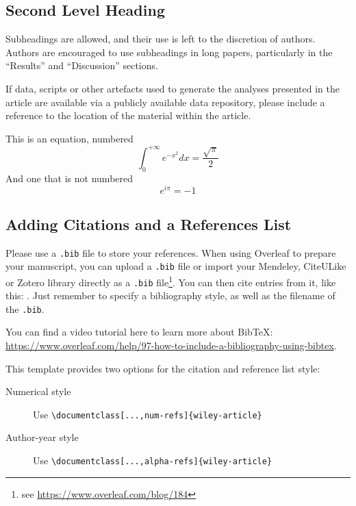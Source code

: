 \documentclass[num-refs]{wiley-article}
\begin{document}
\subsection{Second Level Heading}
Subheadings are allowed, and their use is left to the discretion of authors. 
Authors are encouraged to use subheadings in long papers, particularly in the “Results” and “Discussion” sections. 

If data, scripts or other artefacts used to generate the analyses presented in the article are available via a publicly available data repository, please include a reference to the location of the material within the article.

This is an equation, numbered
\begin{equation}
\int_0^{+\infty}e^{-x^2}dx=\frac{\sqrt{\pi}}{2}
\end{equation}
And one that is not numbered
\begin{equation*}
e^{i\pi}=-1
\end{equation*}

\subsection{Adding Citations and a References List}

Please use a \verb|.bib| file to store your references. 
When using Overleaf to prepare your manuscript, you can upload a \verb|.bib| file or import your Mendeley, CiteULike or Zotero library directly as a \verb|.bib| file\footnote{see \url{https://www.overleaf.com/blog/184}}. 
You can then cite entries from it, like this: \cite{lees2010theoretical}. 
Just remember to specify a bibliography style, as well as the filename of the \verb|.bib|.

You can find a video tutorial here to learn more about BibTeX: \url{https://www.overleaf.com/help/97-how-to-include-a-bibliography-using-bibtex}.

This template provides two options for the citation and reference list style: 
\begin{description}
\item[Numerical style] Use \verb|\documentclass[...,num-refs]{wiley-article}|
\item[Author-year style] Use \verb|\documentclass[...,alpha-refs]{wiley-article}|
\end{description}
\end{document}

